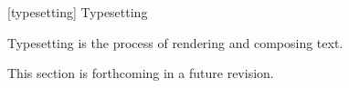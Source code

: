 
 [typesetting] {Typesetting}

%
%
\pnum
Typesetting is the process of rendering and composing text.

%

\pnum
This section is forthcoming in a future revision.

\addtocounter{SectionDepthBase}{1}









\addtocounter{SectionDepthBase}{1}


\addtocounter{SectionDepthBase}{-1}
\addtocounter{SectionDepthBase}{-1}
